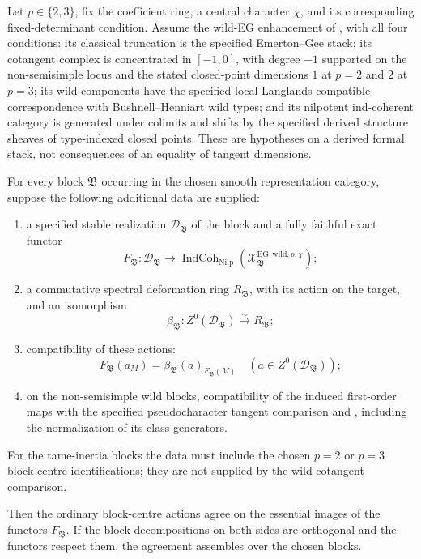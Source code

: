 \begin{proposition}[a blockwise criterion at \(\ell=p\)]
\label{v4-arith:w10-e:prop:ell-equals-v-wild}
\ClaimStatusProvedHereConditional
Let \(p\in\{2,3\}\), fix the coefficient ring, a
central character \(\chi\), and its corresponding
fixed-determinant condition. Assume the wild-EG
enhancement of
,
with all four conditions: its classical truncation is the specified
Emerton--Gee stack; its cotangent complex is concentrated in
$[-1,0]$, with degree $-1$ supported on the non-semisimple locus
and the stated closed-point dimensions $1$ at $p=2$ and $2$ at
$p=3$; its wild components have the specified local-Langlands
compatible correspondence with Bushnell--Henniart wild types; and
its nilpotent ind-coherent category is generated under colimits and
shifts by the specified derived structure sheaves of type-indexed
closed points. These are hypotheses on a derived formal stack,
not consequences of an equality of tangent dimensions.

For every block \(\mathfrak B\) occurring in the
chosen smooth representation category, suppose
the following additional data are supplied:
\begin{enumerate}
\item a specified stable realization
\(\mathcal D_{\mathfrak B}\) of the block and a
fully faithful exact functor
\[
 F_{\mathfrak B}:\mathcal D_{\mathfrak B}
 \longrightarrow
 \operatorname{IndCoh}_{\mathrm{Nilp}}
       (\mathcal X^{\mathrm{EG,wild},p,\chi}_{\mathfrak B});
\]
\item a commutative spectral deformation ring
\(R_{\mathfrak B}\), with its action on the target,
and an isomorphism
\[
 \beta_{\mathfrak B}:
 Z^0(\mathcal D_{\mathfrak B})
       \xrightarrow{\sim}R_{\mathfrak B};
\]
\item compatibility of these actions:
\[
 F_{\mathfrak B}(a_M)
   =\beta_{\mathfrak B}(a)_{F_{\mathfrak B}(M)}
 \quad
 (a\in Z^0(\mathcal D_{\mathfrak B}));
\]
\item on the non-semisimple wild blocks, compatibility
of the induced first-order maps with the specified
pseudocharacter tangent comparison and
, including the
normalization of its class generators.
\end{enumerate}
For the tame-inertia blocks the data must include
the chosen \(p=2\) or \(p=3\) block-centre
identifications; they are not supplied by the
wild cotangent comparison.

Then the ordinary block-centre actions agree on
the essential images of the functors
\(F_{\mathfrak B}\). If the block decompositions
on both sides are orthogonal and the functors
respect them, the agreement assembles over the
chosen blocks.
\end{proposition}

